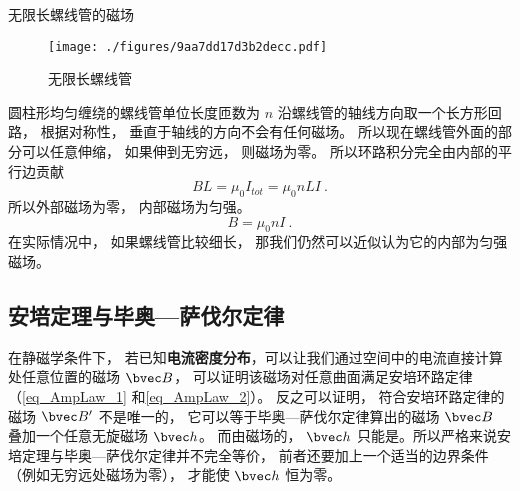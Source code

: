 \begin{example}{无限长螺线管的磁场}\label{ex_AmpLaw_2}
\begin{figure}[ht]
\centering
\texttt{[image: ./figures/9aa7dd17d3b2decc.pdf]}
\caption{无限长螺线管} \label{fig_AmpLaw_1}
\end{figure}
圆柱形均匀缠绕的螺线管单位长度匝数为 $n$ 沿螺线管的轴线方向取一个长方形回路， 根据对称性， 垂直于轴线的方向不会有任何磁场。 所以现在螺线管外面的部分可以任意伸缩， 如果伸到无穷远， 则磁场为零。 所以环路积分完全由内部的平行边贡献
\begin{equation}
BL = \mu_0 I_{tot} = \mu_0 nLI~.
\end{equation}
所以外部磁场为零， 内部磁场为匀强。
\begin{equation}
B = \mu_0 nI~.
\end{equation}
在实际情况中， 如果螺线管比较细长， 那我们仍然可以近似认为它的内部为匀强磁场。
\end{example}

\subsection{安培定理与毕奥—萨伐尔定律}

在静磁学条件下， 若已知\textbf{电流密度分布}，可以让我们通过空间中的电流直接计算处任意位置的磁场 $\bvec B$， 可以证明该磁场对任意曲面满足安培环路定律（\autoref{eq_AmpLaw_1} 和\autoref{eq_AmpLaw_2}）。 反之可以证明， 符合安培环路定律的磁场 $\bvec B'$ 不是唯一的， 它可以等于毕奥—萨伐尔定律算出的磁场 $\bvec B$ 叠加一个任意无旋磁场 $\bvec h$。 而由磁场的， $\bvec h$ 只能是。所以严格来说安培定理与毕奥—萨伐尔定律并不完全等价， 前者还要加上一个适当的边界条件（例如无穷远处磁场为零）， 才能使 $\bvec h$ 恒为零。
